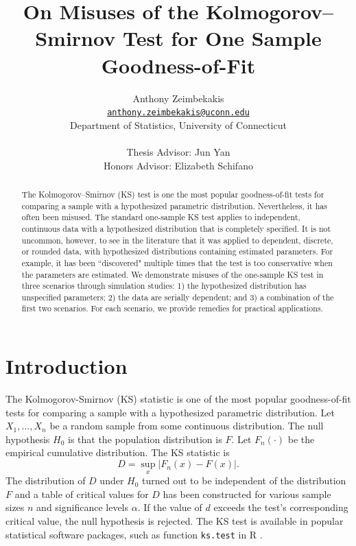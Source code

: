 \documentclass[12pt, letterpaper, titlepage]{article}
\title{On Misuses of the Kolmogorov--Smirnov Test for One Sample Goodness-of-Fit}
\author{Anthony Zeimbekakis\\
\href{mailto:anthony.zeimbekakis@uconn.edu}
{\nolinkurl{anthony.zeimbekakis@uconn.edu}}\\
Department of Statistics, University of Connecticut\\\\
Thesis Advisor: Jun Yan\\
Honors Advisor: Elizabeth Schifano}
\date{}
\begin{document}
\maketitle

\doublespace

\begin{abstract}
The Kolmogorov--Smirnov (KS) test is one the most popular goodness-of-fit tests 
for comparing a sample with a hypothesized parametric distribution. 
Nevertheless, it has often been misused. The standard one-sample KS test applies
to independent, continuous data with a hypothesized distribution that is 
completely specified. It is not uncommon, however, to see in the literature that
it was applied to dependent, discrete, or rounded data, with hypothesized 
distributions containing estimated parameters. For example, it has been 
``discovered" multiple times that the test is too conservative when the 
parameters are estimated. We demonstrate misuses of the one-sample KS test in 
three scenarios through simulation studies:
1) the hypothesized distribution has unspecified parameters;
2) the data are serially dependent; and
3) a combination of the first two scenarios.
For each scenario, we provide remedies for practical applications.
\end{abstract}

\section{Introduction}
\label{sec:intro}

The Kolmogorov-Smirnov (KS) statistic is one of the most popular goodness-of-fit 
tests for comparing a sample with a hypothesized parametric distribution.
Let $X_1, ..., X_n$ be a random sample from some continuous distribution. 
The null hypothesis $H_0$ is that the population distribution is $F$.
Let $F_n(\cdot)$ be the empirical cumulative distribution. The KS statistic is
\begin{equation}
  \label{eq:ks_standard}
  D = \sup_x | F_{n}(x) - F(x) |.
\end{equation}
The distribution of $D$ under $H_0$ turned out to be independent of the
distribution $F$ and a table of critical values for $D$ has been constructed
\citep{Massey} for various sample sizes $n$ and significance 
levels $\alpha$. If the value of $d$ exceeds the test's corresponding critical 
value, the null hypothesis is rejected. The KS test is available in popular 
statistical software packages, such as function \texttt{ks.test} in R 
\citep{R, Marsaglia}.
\end{document}
